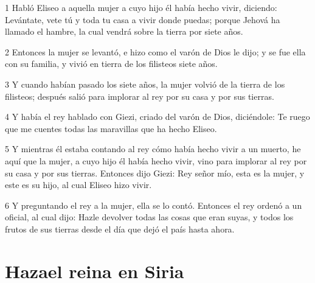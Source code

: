 \par 1 Habló Eliseo a aquella mujer a cuyo hijo él había hecho vivir, diciendo: Levántate, vete tú y toda tu casa a vivir donde puedas; porque Jehová ha llamado el hambre, la cual vendrá sobre la tierra por siete años.
\par 2 Entonces la mujer se levantó, e hizo como el varón de Dios le dijo; y se fue ella con su familia, y vivió en tierra de los filisteos siete años.
\par 3 Y cuando habían pasado los siete años, la mujer volvió de la tierra de los filisteos; después salió para implorar al rey por su casa y por sus tierras.
\par 4 Y había el rey hablado con Giezi, criado del varón de Dios, diciéndole: Te ruego que me cuentes todas las maravillas que ha hecho Eliseo.
\par 5 Y mientras él estaba contando al rey cómo había hecho vivir a un muerto, he aquí que la mujer, a cuyo hijo él había hecho vivir, vino para implorar al rey por su casa y por sus tierras. Entonces dijo Giezi: Rey señor mío, esta es la mujer, y este es su hijo, al cual Eliseo hizo vivir.
\par 6 Y preguntando el rey a la mujer, ella se lo contó. Entonces el rey ordenó a un oficial, al cual dijo: Hazle devolver todas las cosas que eran suyas, y todos los frutos de sus tierras desde el día que dejó el país hasta ahora.

\section*{Hazael reina en Siria}

